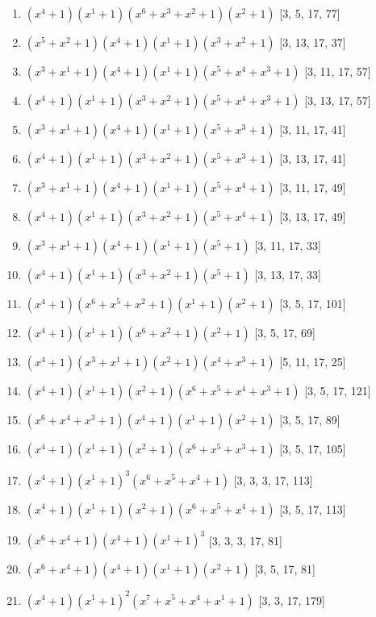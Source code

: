\documentclass[10pt,twocolumn]{article}
\begin{document}
\begin{enumerate}
\item $(x^{4} + 1)(x^{1} + 1)(x^{6} + x^{3} + x^{2} + 1)(x^{2} + 1)$  [3, 5, 17, 77]
\item $(x^{5} + x^{2} + 1)(x^{4} + 1)(x^{1} + 1)(x^{3} + x^{2} + 1)$  [3, 13, 17, 37]
\item $(x^{3} + x^{1} + 1)(x^{4} + 1)(x^{1} + 1)(x^{5} + x^{4} + x^{3} + 1)$  [3, 11, 17, 57]
\item $(x^{4} + 1)(x^{1} + 1)(x^{3} + x^{2} + 1)(x^{5} + x^{4} + x^{3} + 1)$  [3, 13, 17, 57]
\item $(x^{3} + x^{1} + 1)(x^{4} + 1)(x^{1} + 1)(x^{5} + x^{3} + 1)$  [3, 11, 17, 41]
\item $(x^{4} + 1)(x^{1} + 1)(x^{3} + x^{2} + 1)(x^{5} + x^{3} + 1)$  [3, 13, 17, 41]
\item $(x^{3} + x^{1} + 1)(x^{4} + 1)(x^{1} + 1)(x^{5} + x^{4} + 1)$  [3, 11, 17, 49]
\item $(x^{4} + 1)(x^{1} + 1)(x^{3} + x^{2} + 1)(x^{5} + x^{4} + 1)$  [3, 13, 17, 49]
\item $(x^{3} + x^{1} + 1)(x^{4} + 1)(x^{1} + 1)(x^{5} + 1)$  [3, 11, 17, 33]
\item $(x^{4} + 1)(x^{1} + 1)(x^{3} + x^{2} + 1)(x^{5} + 1)$  [3, 13, 17, 33]
\item $(x^{4} + 1)(x^{6} + x^{5} + x^{2} + 1)(x^{1} + 1)(x^{2} + 1)$  [3, 5, 17, 101]
\item $(x^{4} + 1)(x^{1} + 1)(x^{6} + x^{2} + 1)(x^{2} + 1)$  [3, 5, 17, 69]
\item $(x^{4} + 1)(x^{3} + x^{1} + 1)(x^{2} + 1)(x^{4} + x^{3} + 1)$  [5, 11, 17, 25]
\item $(x^{4} + 1)(x^{1} + 1)(x^{2} + 1)(x^{6} + x^{5} + x^{4} + x^{3} + 1)$  [3, 5, 17, 121]
\item $(x^{6} + x^{4} + x^{3} + 1)(x^{4} + 1)(x^{1} + 1)(x^{2} + 1)$  [3, 5, 17, 89]
\item $(x^{4} + 1)(x^{1} + 1)(x^{2} + 1)(x^{6} + x^{5} + x^{3} + 1)$  [3, 5, 17, 105]
\item $(x^{4} + 1)(x^{1} + 1)^{3}(x^{6} + x^{5} + x^{4} + 1)$  [3, 3, 3, 17, 113]
\item $(x^{4} + 1)(x^{1} + 1)(x^{2} + 1)(x^{6} + x^{5} + x^{4} + 1)$  [3, 5, 17, 113]
\item $(x^{6} + x^{4} + 1)(x^{4} + 1)(x^{1} + 1)^{3}$  [3, 3, 3, 17, 81]
\item $(x^{6} + x^{4} + 1)(x^{4} + 1)(x^{1} + 1)(x^{2} + 1)$  [3, 5, 17, 81]
\item $(x^{4} + 1)(x^{1} + 1)^{2}(x^{7} + x^{5} + x^{4} + x^{1} + 1)$  [3, 3, 17, 179]

\end{enumerate}
\end{document}
